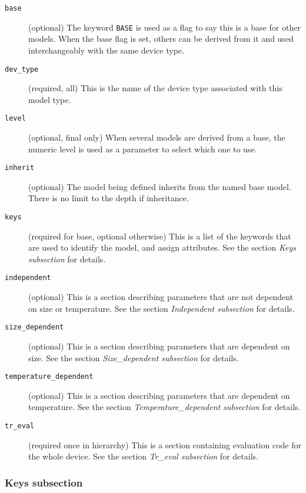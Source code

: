 \begin{description}

\item[{\tt base}] (optional)
The keyword {\tt BASE} is used as a flag to say this is a base for
other models.  When the base flag is set, others can be derived from
it and used interchangeably with the same device type.

\item[{\tt dev\_type}] (required, all)
This is the name of the device type associated with this model type.

\item[{\tt level}] (optional, final only)
When several models are derived from a base, the numeric level is used
as a parameter to select which one to use.

\item[{\tt inherit}] (optional)
The model being defined inherits from the named base model.  There is
no limit to the depth if inheritance.

\item[{\tt keys}] (required for base, optional otherwise)
This is a list of the keywords that are used to identify the model,
and assign attributes.  See the section {\em Keys subsection} for
details.

\item[{\tt independent}] (optional)
This is a section describing parameters that are not dependent on size
or temperature.  See the section {\em Independent subsection} for
details.

\item[{\tt size\_dependent}] (optional)
This is a section describing parameters that are dependent on size.
See the section {\em Size\_dependent subsection} for details.

\item[{\tt temperature\_dependent}] (optional)
This is a section describing parameters that are dependent on
temperature.  See the section {\em Temperature\_dependent subsection}
for details.

\item[{\tt tr\_eval}] (required once in hierarchy)
This is a section containing evaluation code for the whole device.
See the section {\em Tr\_eval subsection} for details.

\end{description}
\subsubsection{Keys subsection}

